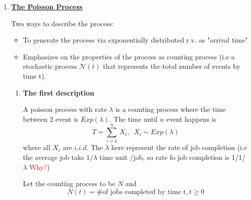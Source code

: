 \documentclass[10.5pt]{article}
\newenvironment{changemargin}[2]{%
  \begin{list}{}{%
    \setlength{\topsep}{0pt}%
    \setlength{\leftmargin}{#1}%
    \setlength{\rightmargin}{#2}%
    \setlength{\listparindent}{\parindent}%
    \setlength{\itemindent}{\parindent}%
    \setlength{\parsep}{\parskip}%
  }%
  \item[]}{\end{list}}
\begin{document}
\begin{changemargin}{-0.125in}{0in}
\begin{enumerate}
                   \bigskip
                   
                   \item \underline{\textbf{The Poisson Process}}
                   
                   \medskip
                   
                   Two ways to describe the process: 
                   \begin{itemize}
                   	\item To generate the process via exponentially distributed r.v. as "arrival time"
                   	\item Emphasizes on the properties of the process as counting process (i.e a stochastic process $\mathcal{N} (t)$ that represents the total number of events by time t).
                   \end{itemize}
                   
                   
                   
                   
                   
                   
                   
                   \begin{enumerate} 
                   \item\textbf{The first description}
                   
                   \smallskip
                   
                   A poisson process with rate $\lambda$ is a counting process where the time between 2 event is $Exp(\lambda)$. The time until $n$ event happens is 
                   \[
                   T = \sum^n_{i=1}\, X_i,\,\,\,X_i \sim Exp(\lambda)
                   \]
                   where all $X_i$ are $i.i.d$. The $\lambda$ here represent the rate of job completion (i.e the average job taks $1/\lambda$ time unit /job, so rate fo job completion is 1/1/$\lambda$ \textcolor{red}{Why?})
                   
                   \medskip
                   
                   Let the counting process to be $N$ and 
                   \[
                   N(t) = \text{\# of jobs completed by time t}, t\geq 0
                   \]
                   
                   \bigskip
                   
                   \begin{center}
                   	

\end{center}
\end{enumerate}
\end{enumerate}
\end{changemargin}
\end{document}
